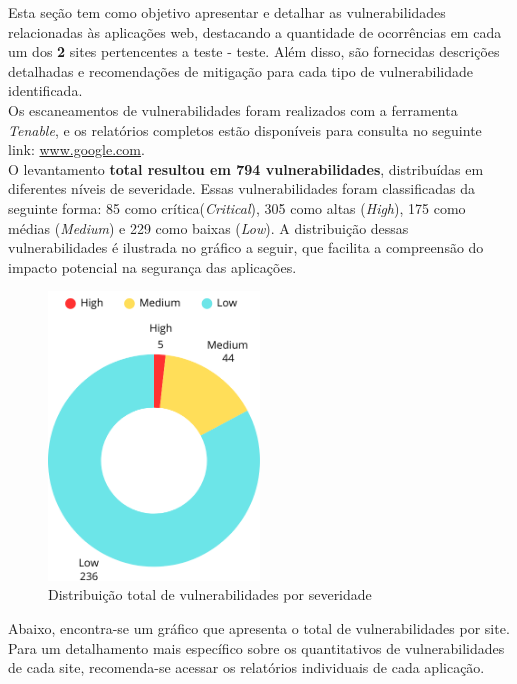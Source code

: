 \documentclass[a4paper,12pt]{article}
\begin{document}
Esta seção tem como objetivo apresentar e detalhar as vulnerabilidades relacionadas às aplicações web, destacando a quantidade de ocorrências em cada um dos \textbf{2} sites pertencentes a teste - teste. Além disso, são fornecidas descrições detalhadas e recomendações de mitigação para cada tipo de vulnerabilidade identificada.\\

Os escaneamentos de vulnerabilidades foram realizados com a ferramenta \textit{Tenable}, e os relatórios completos estão disponíveis para consulta no seguinte link: \url{www.google.com}.\\

O levantamento \textbf{total resultou em 794 vulnerabilidades}, distribuídas em diferentes níveis de severidade. Essas vulnerabilidades foram classificadas da seguinte forma: 85 como crítica(\textit{Critical}), 305 como altas (\textit{High}), 175 como médias (\textit{Medium}) e 229 como baixas (\textit{Low}). A distribuição dessas vulnerabilidades é ilustrada no gráfico a seguir, que facilita a compreensão do impacto potencial na segurança das aplicações.

\begin{figure}[h!]
    \centering
    \includegraphics[width=0.5\textwidth]{assets/images-was/Total_Vulnerabilidades.png}
    \caption{Distribuição total de vulnerabilidades por severidade}
\end{figure}
\FloatBarrier

Abaixo, encontra-se um gráfico que apresenta o total de vulnerabilidades por site. Para um detalhamento mais específico sobre os quantitativos de vulnerabilidades de cada site, recomenda-se acessar os relatórios individuais de cada aplicação.
\end{document}
